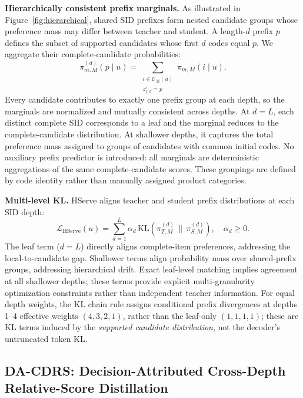\documentclass[sigconf, anonymous, review]{acmart}
\newcommand{\C}{\mathcal{C}}
\newcommand{\KL}{\mathrm{KL}}
\begin{document}
\textbf{Hierarchically consistent prefix marginals.} As illustrated
in Figure~\ref{fig:hierarchical}, shared SID prefixes form nested
candidate groups whose preference mass may differ between teacher and
student. A length-$d$ prefix $p$ defines the subset of supported
candidates whose first $d$ codes equal $p$. We aggregate their complete-candidate
probabilities:
\begin{equation}
\pi_{m,M}^{(d)}(p\mid u)=
\sum_{\substack{i\in\C_M(u)\\z_{1:d}^i=p}}
\pi_{m,M}(i\mid u).
\label{eq:prefix-marginal}
\end{equation}
Every candidate contributes to exactly one prefix group at each
depth, so the marginals are normalized and mutually consistent across
depths. At $d=L$, each distinct complete SID corresponds to a leaf
and the marginal reduces to the complete-candidate distribution. At
shallower depths, it captures the total preference mass assigned to
groups of candidates with common initial codes. No auxiliary prefix
predictor is introduced: all marginals are deterministic aggregations
of the same complete-candidate scores. These groupings are defined by
code identity rather than manually assigned product categories.

\textbf{Multi-level KL.} HServe aligns teacher and student
prefix distributions at each SID depth:
\begin{equation}
\mathcal L_{\mathrm{HServe}}(u)=
\sum_{d=1}^{L}\alpha_d\,
\KL\!\left(\pi_{T,M}^{(d)}\,\|\,\pi_{S,M}^{(d)}\right),
\quad \alpha_d\ge0.
\label{eq:hserve}
\end{equation}
The leaf term ($d=L$) directly aligns complete-item preferences,
addressing the local-to-candidate gap. Shallower terms align probability
mass over shared-prefix groups, addressing hierarchical drift.
Exact leaf-level matching implies agreement at all shallower depths;
these terms provide explicit multi-granularity optimization constraints
rather than independent teacher information. For equal depth weights, the KL chain rule assigns conditional
prefix divergences at depths 1--4 effective weights $(4,3,2,1)$,
rather than the leaf-only $(1,1,1,1)$; these are KL terms induced
by the \emph{supported candidate distribution}, not the decoder's
untruncated token KL.

\subsection{DA-CDRS: Decision-Attributed Cross-Depth
Relative-Score Distillation}
\label{sec:method-dacdrs}
\end{document}
